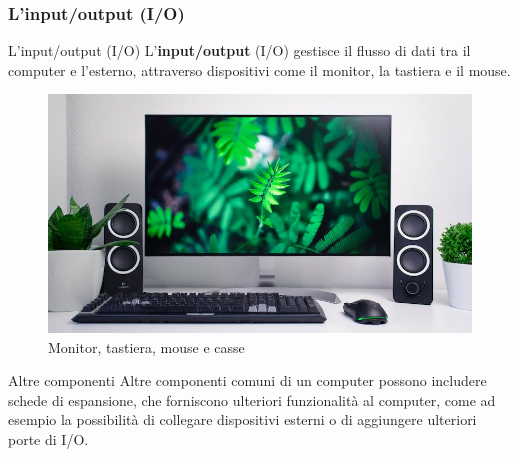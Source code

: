 \subsubsection[L'input/output (I/O)]{L'input/output (I/O)}
\begin{frame}
	
	\begin{block}{L'input/output (I/O)} 
		L'\textbf{input/output} (I/O) gestisce il flusso di dati tra il computer e l'esterno, attraverso dispositivi come il monitor, la tastiera e il mouse.
	\end{block}
	
	\begin{figure}[!htbp] 
		\centering
		\includegraphics[width=0.8\linewidth]{images/3_modelli/io.jpg}
		\caption{Monitor, tastiera, mouse e casse}
		\label{fig:models_io}
	\end{figure}
	 
\end{frame}


\begin{frame}
	
	\begin{block}{Altre componenti}
		Altre componenti comuni di un computer possono includere schede di espansione, che forniscono ulteriori funzionalità al computer, come ad esempio la possibilità di collegare dispositivi esterni o di aggiungere ulteriori porte di I/O.
	\end{block}
	
	
\end{frame}


